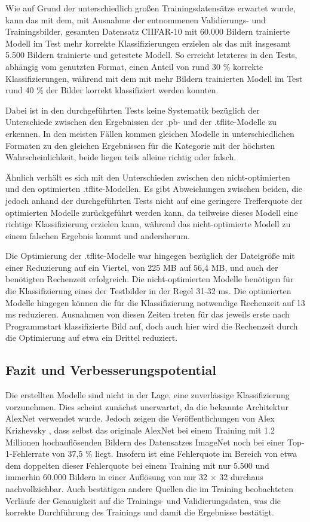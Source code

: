 Wie auf Grund der unterschiedlich großen Trainingsdatensätze erwartet wurde, kann das mit dem, mit Ausnahme der entnommenen Validierungs- und Trainingsbilder, gesamten Datensatz CIIFAR-10 mit 60.000 Bildern trainierte Modell im Test mehr korrekte Klassifizierungen erzielen als das mit insgesamt 5.500
Bildern trainierte und getestete Modell. So erreicht letzteres in den Tests, abhängig vom genutzten Format, einen Anteil von rund 30 \% korrekte Klassifizierungen, während mit dem mit mehr Bildern trainierten Modell im Test rund 40 \% der Bilder korrekt klassifiziert werden konnten.

Dabei ist in den durchgeführten Tests keine Systematik bezüglich der Unterschiede zwischen den Ergebnissen der .pb- und der .tflite-Modelle zu erkennen. In den meisten Fällen kommen gleichen Modelle in unterschiedlichen Formaten zu den gleichen Ergebnissen für die Kategorie mit der höchsten Wahrscheinlichkeit, beide liegen teils alleine richtig oder falsch.


Ähnlich verhält es sich mit den Unterschieden zwischen den nicht-optimierten und den optimierten .tflite-Modellen. Es gibt Abweichungen zwischen beiden, die jedoch anhand der durchgeführten Tests nicht auf eine geringere Trefferquote der optimierten Modelle zurückgeführt werden kann, da teilweise dieses Modell eine richtige Klassifizierung erzielen kann, während das nicht-optimierte Modell zu einem falschen Ergebnis kommt und andersherum.


Die Optimierung der .tflite-Modelle war hingegen bezüglich der Dateigröße mit einer Reduzierung auf ein Viertel, von 225 MB auf 56,4 MB, und auch der benötigten Rechenzeit erfolgreich. Die nicht-optimierten Modelle benötigen für die Klassifizierung eines der Testbilder in der Regel 31-32 ms. Die optimierten Modelle hingegen können die für die Klassifizierung notwendige Rechenzeit auf 13 ms reduzieren. Ausnahmen von diesen Zeiten  treten für das jeweils erste nach Programmstart klassifizierte Bild auf, doch auch hier wird die Rechenzeit durch die Optimierung auf etwa ein Drittel reduziert.


\subsection{Fazit und Verbesserungspotential}

Die erstellten Modelle sind nicht in der Lage, eine zuverlässige Klassifizierung vorzunehmen. Dies scheint zunächst unerwartet, da die bekannte Architektur AlexNet verwendet wurde. Jedoch zeigen die Veröffentlichungen von Alex Krizhevsky \cite{Krizhevsky:2012}, dass selbst das
originale AlexNet bei einem Training mit 1.2 Millionen hochauflösenden Bildern des Datensatzes ImageNet noch bei einer Top-1-Fehlerrate von 37,5 \% liegt. Insofern ist eine Fehlerquote im Bereich von etwa dem doppelten dieser Fehlerquote bei einem Training mit nur 5.500 und immerhin 60.000 Bildern in einer Auflösung von nur 32 $\times$ 32 durchaus nachvollziehbar. Auch bestätigen andere Quellen die im Training beobachteten Verläufe der Genauigkeit auf die Trainings- und Validierungsdaten, was die korrekte Durchführung des Trainings und damit die Ergebnisse bestätigt.\cite{kaggle.21.09.2020}

